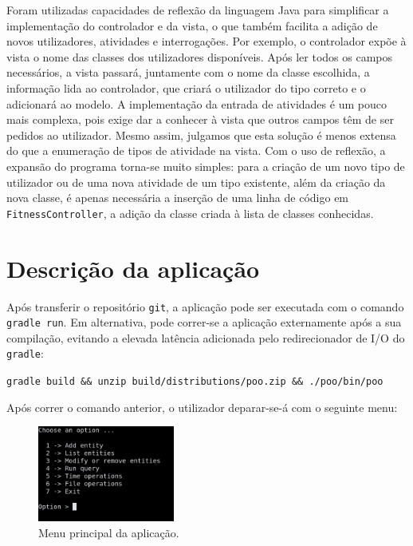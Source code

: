 \documentclass[12pt, a4paper]{article}
\begin{document}
Foram utilizadas capacidades de reflexão da linguagem Java para simplificar a implementação do
controlador e da vista, o que também facilita a adição de novos utilizadores, atividades e
interrogações. Por exemplo, o controlador expõe à vista o nome das classes dos utilizadores
disponíveis. Após ler todos os campos necessários, a vista passará, juntamente com o nome da classe
escolhida, a informação lida ao controlador, que criará o utilizador do tipo correto e o adicionará
ao modelo. A implementação da entrada de atividades é um pouco mais complexa, pois exige dar a
conhecer à vista que outros campos têm de ser pedidos ao utilizador. Mesmo assim, julgamos que esta
solução é menos extensa do que a enumeração de tipos de atividade na vista. Com o uso de reflexão, a
expansão do programa torna-se muito simples: para a criação de um novo tipo de utilizador ou de uma
nova atividade de um tipo existente, além da criação da nova classe, é apenas necessária a inserção
de uma linha de código em \texttt{FitnessController}, a adição da classe criada à lista de classes
conhecidas.

\section{Descrição da aplicação}

Após transferir o repositório \texttt{git}, a aplicação pode ser executada com o comando
\texttt{gradle run}. Em alternativa, pode correr-se a aplicação externamente após a sua compilação,
evitando a elevada latência adicionada pelo redirecionador de I/O do \texttt{gradle}:

\begin{center}
    \texttt{gradle build \&\& unzip build/distributions/poo.zip \&\& ./poo/bin/poo}
\end{center}

Após correr o comando anterior, o utilizador deparar-se-á com o seguinte menu: \\

\begin{figure}[H]
    \centering
    \includegraphics[width=0.4\textwidth]{MainMenu.png}
    \caption{Menu principal da aplicação.}
\end{figure}
\end{document}
